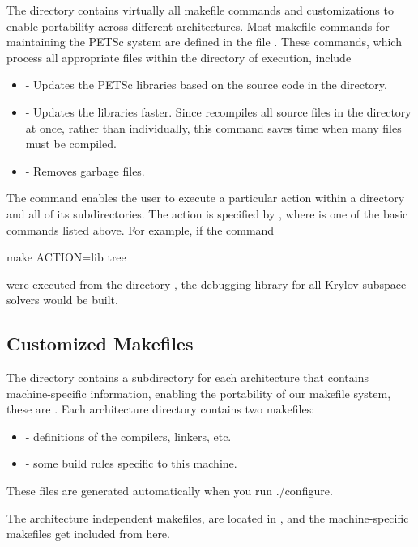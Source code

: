 {{{The directory  contains virtually all
makefile commands and customizations to enable portability across
different architectures.  Most makefile commands for maintaining the
PETSc system are defined in the file .
These commands, which process all appropriate files within the
directory of execution, include
\begin{itemize}
\item {} - Updates the PETSc libraries based on the source code
      in the directory.
\item {} - Updates the libraries faster.  Since
       recompiles all source files in the directory at once,
      rather than individually, this command saves time when many files
      must be compiled.
\item {} - Removes garbage files.
\end{itemize}

The  command enables the user to execute a particular action
within a directory and all of its subdirectories.  The action is specified
by , where  is one of the basic commands
listed above. For example, if the command
\begin{tabbing}
   make ACTION=lib tree
\end{tabbing}
were executed from the directory ,
the debugging library for all Krylov subspace solvers would be built.

\subsection{Customized Makefiles}
\label{sec_custom}

The directory  contains a subdirectory for each
architecture that contains machine-specific information, enabling the
portability of our makefile system, these are .
 Each architecture directory contains
two makefiles:
\begin{itemize}
\item {} - definitions of the compilers, linkers, etc.
\item {} - some build rules specific to this machine.
\end{itemize}
These files are generated automatically when you run ./configure.

The architecture independent makefiles, are located in
, and the machine-specific
makefiles get included from here.

}}}
